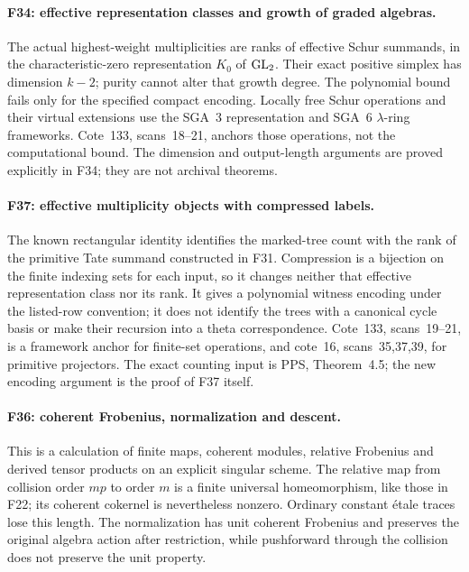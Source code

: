\documentclass[11pt,a4paper]{article}
\newcommand{\fid}[1]{\textsf{#1}}\newcommand{\gate}[1]{\textsf{#1}}
\theoremstyle{named}\newtheorem{finding}{Finding}[section]
\theoremstyle{definition}\newtheorem{definition}[finding]{Definition}
\theoremstyle{remark}\newtheorem{remark}[finding]{Remark}
\begin{document}
\paragraph{\fid{F34}: effective representation classes and growth of graded algebras.}
The actual highest-weight multiplicities are ranks of effective Schur
summands, in the characteristic-zero representation $K_0$ of $\mathrm{GL}_2$.
Their exact positive simplex has dimension $k-2$; purity cannot alter
that growth degree. The polynomial bound fails only for the specified
compact encoding. Locally free Schur operations and their virtual
extensions use the SGA~3 representation and SGA~6 $\lambda$-ring
frameworks. Cote~133, scans~18--21, anchors those operations, not the
computational bound. The dimension and output-length arguments are
proved explicitly in \fid{F34}; they are not archival theorems.

\paragraph{\fid{F37}: effective multiplicity objects with compressed labels.}
The known rectangular identity identifies the marked-tree count with
the rank of the primitive Tate summand constructed in \fid{F31}.
Compression is a bijection on the finite indexing sets for each input,
so it changes neither that effective representation class nor its rank.
It gives a polynomial witness encoding under the listed-row convention;
it does not identify the trees with a canonical cycle basis or make their
recursion into a theta correspondence. Cote~133, scans~19--21, is a
framework anchor for finite-set operations, and cote~16, scans~35,37,39,
for primitive projectors. The exact counting input is PPS, Theorem~4.5;
the new encoding argument is the proof of \fid{F37} itself.



\paragraph{\fid{F36}: coherent Frobenius, normalization and descent.}

This is a calculation of finite maps, coherent modules, relative
Frobenius and derived tensor products on an explicit singular scheme.
The relative map from collision order $mp$ to order $m$ is a finite
universal homeomorphism, like those in \fid{F22}; its coherent cokernel
is nevertheless nonzero. Ordinary constant \'etale traces lose this
length. The normalization has unit coherent Frobenius and preserves
the original algebra action after restriction, while pushforward
through the collision does not preserve the unit property.
\end{document}
